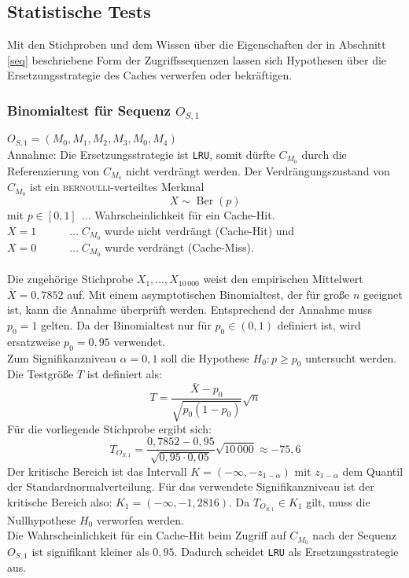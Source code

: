 \documentclass[]{scrbook}
\begin{document}
\subsection{Statistische Tests}

Mit den Stichproben und dem Wissen über die Eigenschaften der in Abschnitt \ref{seq} beschriebene Form der Zugriffssequenzen lassen sich Hypothesen über die Ersetzungsstrategie des Caches verwerfen oder bekräftigen.

\subsubsection{Binomialtest für Sequenz $O_{S,1}$}

$O_{S,1} = (M_0 , M_1 , M_2 , M_3 , M_0 , M_4 )$
\\
Annahme: Die Ersetzungsstrategie ist \texttt{LRU}, somit dürfte $C_{M_0}$ durch die Referenzierung von $C_{M_4}$ nicht verdrängt werden.
Der Verdrängungszustand von $C_{M_0}$ ist ein \textsc{bernoulli}-verteiltes Merkmal
$$X \sim \operatorname{Ber}(p)$$
mit $p \in [0,1] \;\, \dots$ Wahrscheinlichkeit für ein Cache-Hit.  
\\
$X=1 \quad\quad\quad \dots \; C_{M_0}$ wurde nicht verdrängt (Cache-Hit) und
\\
$X=0 \quad\quad\quad \dots \; C_{M_0}$ wurde verdrängt (Cache-Miss).  
\\
\\
Die zugehörige Stichprobe $X_1,\dots,X_{10\,000}$ weist den empirischen Mittelwert $\bar{X} = 0,7852$ auf.
Mit einem asymptotischen Binomialtest, der für große $n$ geeignet ist, kann die Annahme überprüft werden.
Entsprechend der Annahme muss $p_0 = 1$ gelten. Da der Binomialtest nur für $p_0 \in (0,1)$ definiert ist, wird ersatzweise $p_0 = 0,95$ verwendet.
\\
Zum Signifikanzniveau $\alpha = 0,1$ soll die Hypothese $H_0: p \ge p_0$ untersucht werden.
Die Testgröße $T$ ist definiert als:
$$T = \frac{\bar{X} - p_0}{\sqrt{p_0 (1-p_0)}} \sqrt{n}$$
Für die vorliegende Stichprobe ergibt sich: 
$$T_{O_{S,1}} = \frac{0,7852 - 0,95}{\sqrt{0,95 \cdot 0,05}} \sqrt{10\,000} \approx -75,6$$
Der kritische Bereich ist das Intervall $K = (-\infty, -z_{1-\alpha})$ mit $z_{1-\alpha}$ dem Quantil der Standardnormalverteilung. 
Für das verwendete Signifikanzniveau ist der kritische Bereich also: $K_1 = (-\infty, -1,2816)$.
Da $T_{O_{S,1}} \in K_1$ gilt, muss die Nullhypothese $H_0$ verworfen werden.
\\
Die Wahrscheinlichkeit für ein Cache-Hit beim Zugriff auf $C_{M_0}$ nach der Sequenz $O_{S,1}$ ist signifikant kleiner als $0,95$.
Dadurch scheidet \texttt{LRU} als Ersetzungsstrategie aus. 
\end{document}
